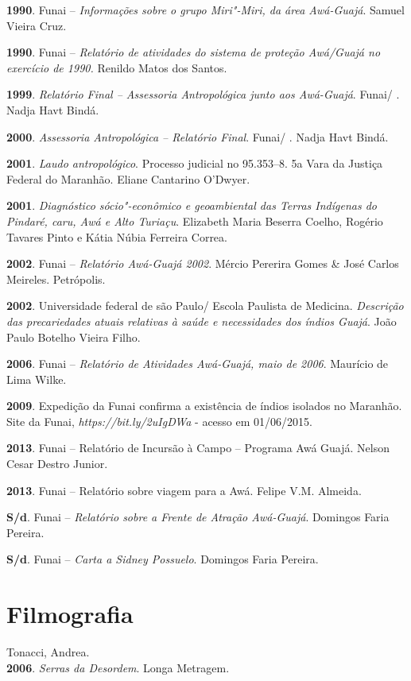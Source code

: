 \begin{Parskip}
\textbf{1990}. Funai -- \emph{Informações sobre o grupo Miri"-Miri, da
área Awá-Guajá}. Samuel Vieira Cruz.

\textbf{1990}. Funai -- \emph{Relatório de atividades do sistema de
proteção Awá/Guajá no exercício de 1990.} Renildo Matos dos Santos.

\textbf{1999}. \emph{Relatório Final -- Assessoria Antropológica junto aos
Awá-Guajá}. Funai/ . Nadja Havt Bindá.

\textbf{2000}. \emph{Assessoria Antropológica -- Relatório Final}. Funai/
. Nadja Havt Bindá.

\textbf{2001}. \emph{Laudo antropológico}. Processo judicial no
95.353--8. 5a Vara da Justiça Federal do Maranhão. Eliane Cantarino
O'Dwyer.

\textbf{2001}. \emph{Diagnóstico sócio"-econômico e geoambiental das
Terras Indígenas do Pindaré, caru, Awá e Alto Turiaçu}. Elizabeth Maria
Beserra Coelho, Rogério Tavares Pinto e Kátia Núbia Ferreira Correa.

\textbf{2002}. Funai -- \emph{Relatório Awá-Guajá 2002}. Mércio Pererira
Gomes \& José Carlos Meireles. Petrópolis.

\textbf{2002}. Universidade federal de são Paulo/ Escola Paulista de
Medicina. \emph{Descrição das precariedades atuais relativas à saúde e
necessidades dos índios Guajá}. João Paulo Botelho Vieira Filho.

\textbf{2006}. Funai -- \emph{Relatório de Atividades Awá-Guajá, maio de
2006}. Maurício de Lima Wilke.

\textbf{2009}. Expedição da Funai confirma a existência de índios
isolados no Maranhão. Site da Funai,
\emph{https://bit.ly/2uIgDWa} - acesso em 01/06/2015.

\textbf{2013}. Funai -- Relatório de Incursão à Campo -- Programa Awá
Guajá. Nelson Cesar Destro Junior.

\textbf{2013}. Funai -- Relatório sobre viagem para a  Awá. Felipe V.M.
Almeida.

\textbf{S/d}. Funai -- \emph{Relatório sobre a Frente de Atração
Awá-Guajá}. Domingos Faria Pereira.

\textbf{S/d}. Funai -- \emph{Carta a Sidney Possuelo}. Domingos Faria
Pereira.

\section{Filmografia}

Tonacci, Andrea.\\
\textbf{2006}. \emph{Serras da Desordem}. Longa Metragem.
\end{Parskip}

